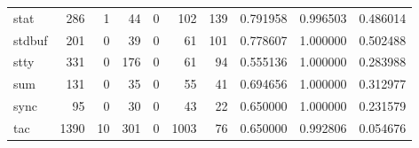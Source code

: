 \begin{longtable}{lrrrrrrrrr}
stat      &                                                286 &                                                  1 &                                                 44 &                                                  0 &                                                102 &                                                139 &                                           0.791958 &                               0.996503 &                             0.486014 \\
stdbuf    &                                                201 &                                                  0 &                                                 39 &                                                  0 &                                                 61 &                                                101 &                                           0.778607 &                               1.000000 &                             0.502488 \\
stty      &                                                331 &                                                  0 &                                                176 &                                                  0 &                                                 61 &                                                 94 &                                           0.555136 &                               1.000000 &                             0.283988 \\
sum       &                                                131 &                                                  0 &                                                 35 &                                                  0 &                                                 55 &                                                 41 &                                           0.694656 &                               1.000000 &                             0.312977 \\
sync      &                                                 95 &                                                  0 &                                                 30 &                                                  0 &                                                 43 &                                                 22 &                                           0.650000 &                               1.000000 &                             0.231579 \\
tac       &                                               1390 &                                                 10 &                                                301 &                                                  0 &                                               1003 &                                                 76 &                                           0.650000 &                               0.992806 &                             0.054676 \\

\end{longtable}
